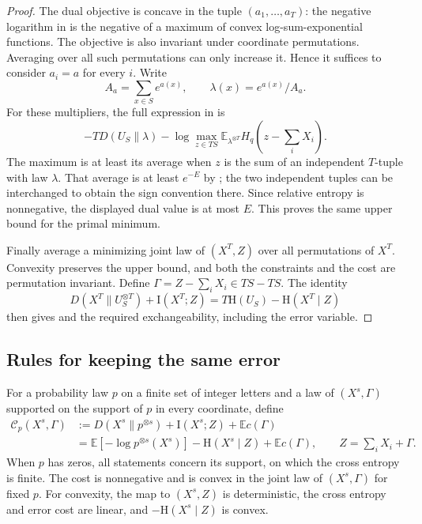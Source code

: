 \begin{proof}
The dual objective is concave in the tuple $(a_1,\ldots,a_T)$: the negative
logarithm in  is the negative of a maximum
of convex log-sum-exponential functions.  The objective is also invariant
under coordinate permutations.  Averaging over all such permutations can
only increase it.  Hence it suffices to consider $a_i=a$ for every $i$.
Write
\[
 A_a=\sum_{x\in S}e^{a(x)},\qquad \lambda(x)=e^{a(x)}/A_a.
\]
For these multipliers, the full expression in
 is
\[
 -T D(U_S\|\lambda)
 -\log\max_{z\in TS}
       \mathbb E_{\lambda^{\otimes T}}
           H_q\!\left(z-\sum_iX_i\right).
\]
The maximum is at least its average when $z$ is the sum of an independent
$T$-tuple with law $\lambda$.  That average is at least $e^{-E}$ by
; the two independent tuples
can be interchanged to obtain the sign convention there.  Since relative
entropy is nonnegative, the displayed dual value is at most $E$.  This
proves the same upper bound for the primal minimum.

Finally average a minimizing joint law of $(X^T,Z)$ over all permutations
of $X^T$.  Convexity preserves the upper bound, and both the constraints
and the cost are permutation invariant.  Define
$\Gamma=Z-\sum_iX_i\in TS-TS$.  The identity
\[
 D(X^T\|U_S^{\otimes T})+\mathrm I(X^T;Z)
       =T\mathrm H(U_S)-\mathrm H(X^T\mid Z)
\]
then gives  and the required exchangeability, including
the error variable.
\end{proof}

\subsection{Rules for keeping the same error}

For a probability law $p$ on a finite set of integer letters and a law of
$(X^s,\Gamma)$ supported on the support of $p$ in every coordinate, define
\begin{equation}
\label{entropy-foundations:cost-definition}
\begin{split}
 \mathcal C_p(X^s,\Gamma)
  &:=D(X^s\|p^{\otimes s})
       +\mathrm I(X^s;Z)+\mathbb E c(\Gamma)\\
  &=\mathbb E[-\log p^{\otimes s}(X^s)]
       -\mathrm H(X^s\mid Z)+\mathbb E c(\Gamma),
       \qquad Z=\sum_iX_i+\Gamma.
\end{split}
\end{equation}
When $p$ has zeros, all statements concern its support, on which the
cross entropy is finite.  The cost is nonnegative and is convex in the
joint law of $(X^s,\Gamma)$ for fixed $p$.  For convexity, the map to
$(X^s,Z)$ is deterministic, the cross entropy and error cost are linear,
and $-\mathrm H(X^s\mid Z)$ is convex.


